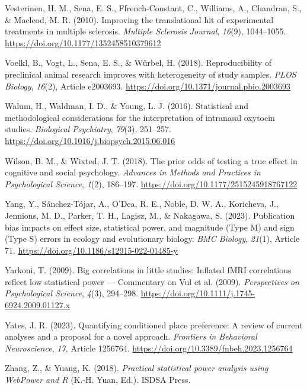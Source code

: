 \documentclass[authordate, meta]{jote-new-article}
\begin{document}
	Vesterinen, H. M., Sena, E. S., Ffrench-Constant, C., Williams, A., Chandran, S., \& Macleod, M. R. (2010). Improving the translational hit of experimental treatments in multiple sclerosis. \emph{Multiple Sclerosis Journal}, \emph{16}(9), 1044--1055. \url{https://doi.org/10.1177/1352458510379612}



	Voelkl, B., Vogt, L., Sena, E. S., \& Würbel, H. (2018). Reproducibility of preclinical animal research improves with heterogeneity of study samples. \emph{PLOS Biology}, \emph{16}(2), Article e2003693. \url{https://doi.org/10.1371/journal.pbio.2003693}



	Walum, H., Waldman, I. D., \& Young, L. J. (2016). Statistical and methodological considerations for the interpretation of intranasal oxytocin studies. \emph{Biological Psychiatry}, \emph{79}(3), 251--257. \url{https://doi.org/10.1016/j.biopsych.2015.06.016}



	Wilson, B. M., \& Wixted, J. T. (2018). The prior odds of testing a true effect in cognitive and social psychology. \emph{Advances in Methods and Practices in Psychological Science}, \emph{1}(2), 186--197. \url{https://doi.org/10.1177/2515245918767122}



	Yang, Y., Sánchez-Tójar, A., O'Dea, R. E., Noble, D. W. A., Koricheva, J., Jennions, M. D., Parker, T. H., Lagisz, M., \& Nakagawa, S. (2023). Publication bias impacts on effect size, statistical power, and magnitude (Type M) and sign (Type S) errors in ecology and evolutionary biology. \emph{BMC Biology}, \emph{21}(1), Article 71. \url{https://doi.org/10.1186/s12915-022-01485-y}



	Yarkoni, T. (2009). Big correlations in little studies: Inflated fMRI correlations reflect low statistical power — Commentary on Vul et al. (2009). \emph{Perspectives on Psychological Science}, \emph{4}(3), 294--298. \url{https://doi.org/10.1111/j.1745-6924.2009.01127.x}



	Yates, J. R. (2023). Quantifying conditioned place preference: A review of current analyses and a proposal for a novel approach. \emph{Frontiers in Behavioral Neuroscience}, \emph{17, }Article 1256764. \url{https://doi.org/10.3389/fnbeh.2023.1256764}



	Zhang, Z., \& Yuang, K. (2018). \emph{Practical statistical power analysis using WebPower and R} (K.-H. Yuan, Ed.). ISDSA Press.
\end{document}
